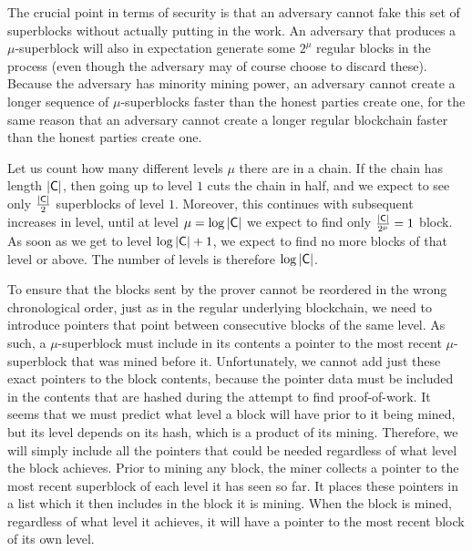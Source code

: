 The crucial point in terms of security is that an adversary cannot fake this
set of superblocks without actually putting in the work. An adversary that
produces a $\mu$-superblock will also in expectation generate some $2^\mu$
regular blocks in the process (even though the adversary may of course choose
to discard these). Because the adversary has minority mining power, an adversary
cannot create a longer sequence of $\mu$-superblocks faster than the honest
parties create one, for the same reason that an adversary cannot create a longer
regular blockchain faster than the honest parties create one.

Let us count how many different levels $\mu$ there are in a chain. If the chain
has length $|\mathsf{C}|$, then going up to level $1$ cuts the chain in half, and we
expect to see only $\frac{|\mathsf{C}|}{2}$ superblocks of level $1$. Moreover, this
continues with subsequent increases in level, until at level $\mu =
\log|\mathsf{C}|$ we expect to find only $\frac{|\mathsf{C}|}{2^\mu} = 1$ block. As soon
as we get to level $\log|\mathsf{C}| + 1$, we expect to find no more blocks of that
level or above. The number of levels is therefore $\log|\mathsf{C}|$.

To ensure that the blocks sent by the prover cannot be reordered in the wrong
chronological order, just as in the regular underlying blockchain, we need to
introduce pointers that point between consecutive blocks of the same level. As
such, a $\mu$-superblock must include in its contents a pointer to the most
recent $\mu$-superblock that was mined before it. Unfortunately, we cannot add
just these exact pointers to the block contents, because the pointer data must
be included in the contents that are hashed during the attempt to find
proof-of-work. It seems that we must predict what level a block will have prior
to it being mined, but its level depends on its hash, which is a product of its
mining. Therefore, we will simply include all the pointers that could be needed
regardless of what level the block achieves. Prior to mining any block, the
miner collects a pointer to the most recent superblock of each level it has seen
so far. It places these pointers in a list which it then includes in the block
it is mining. When the block is mined, regardless of what level it achieves, it
will have a pointer to the most recent block of its own level.

